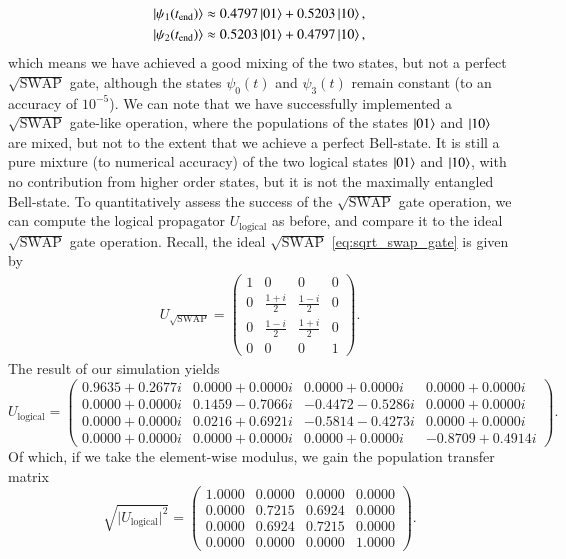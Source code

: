 \documentclass{subfiles}
\begin{document}
\begin{align*}
    \ket{\psi_1(t_{\text{end}})} &\approx 0.4797 \ket{01} + 0.5203 \ket{10}, \\
    \ket{\psi_2(t_{\text{end}})} &\approx 0.5203 \ket{01} + 0.4797 \ket{10},
\end{align*}
which means we have achieved a good mixing of the two states, but not a perfect $\sqrt{\text{SWAP}}$ gate, although the states $\psi_0(t)$ and $\psi_3(t)$ remain constant (to an accuracy of $10^{-5}$). We can note that we have successfully implemented a $\sqrt{\text{SWAP}}$ gate-like operation, where the populations of the states $\ket{01}$ and $\ket{10}$ are mixed, but not to the extent that we achieve a perfect Bell-state. It is still a pure mixture (to numerical accuracy) of the two logical states $\ket{01}$ and $\ket{10}$, with no contribution from higher order states, but it is not the maximally entangled Bell-state. 
To quantitatively assess the success of the $\sqrt{\text{SWAP}}$ gate operation, we can compute the logical propagator $U_{\text{logical}}$ as before, and compare it to the ideal $\sqrt{\text{SWAP}}$ gate operation. Recall, the ideal $\sqrt{\text{SWAP}}$ \ref{eq:sqrt_swap_gate} is given by 
\begin{align*}
    U_{\sqrt{\text{SWAP}}} = \begin{pmatrix}
        1 & 0 & 0 & 0 \\
        0 & \frac{1 + i}{2} & \frac{1 - i}{2} & 0 \\
        0 & \frac{1 - i}{2} & \frac{1 + i}{2} & 0 \\
        0 & 0 & 0 & 1
    \end{pmatrix}.
\end{align*}
The result of our simulation yields
\begin{equation}
U_{\mathrm{logical}}
=
\begin{pmatrix}
 0.9635 + 0.2677i & 0.0000 + 0.0000i & 0.0000 + 0.0000i & 0.0000 + 0.0000i\\
 0.0000 + 0.0000i & 0.1459 - 0.7066i & -0.4472 - 0.5286i & 0.0000 + 0.0000i\\
 0.0000 + 0.0000i & 0.0216 + 0.6921i & -0.5814 - 0.4273i & 0.0000 + 0.0000i\\
 0.0000 + 0.0000i & 0.0000 + 0.0000i & 0.0000 + 0.0000i & -0.8709 + 0.4914i
\end{pmatrix}.
\end{equation}
Of which, if we take the element-wise modulus, we gain the population transfer matrix
\begin{equation}
\sqrt{\lvert U_{\mathrm{logical}}\rvert^2}
=\begin{pmatrix}
1.0000 & 0.0000 & 0.0000 & 0.0000\\
0.0000 & 0.7215 & 0.6924 & 0.0000\\
0.0000 & 0.6924 & 0.7215 & 0.0000\\
0.0000 & 0.0000 & 0.0000 & 1.0000
\end{pmatrix}.
\end{equation}
\end{document}
